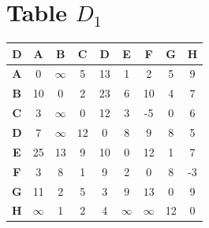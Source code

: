 \documentclass{article}
\begin{document}
\section{Table $D_{1}$}
\begin{center}
    \begin{tabular}{|c||c|c|c|c|c|c|c|c|}
        \hline
        \textbf{D} & \textbf{A} & \textbf{B} & \textbf{C} & \textbf{D} & \textbf{E} & \textbf{F} & \textbf{G} & \textbf{H} \\
        \hline
        \hline
        \textbf{A}& 0 & $\infty$ & 5 & 13 & 1 & 2 & 5 & 9 \\
        \hline
        \textbf{B}& 10 & 0 & 2 & \cellcolor[HTML]{D74894}$23$ & 6 & 10 & 4 & 7 \\
        \hline
        \textbf{C}& 3 & $\infty$ & 0 & 12 & 3 & -5 & 0 & 6 \\
        \hline
        \textbf{D}& 7 & $\infty$ & \cellcolor[HTML]{D74894}$12$ & 0 & 8 & \cellcolor[HTML]{D74894}$9$ & 8 & 5 \\
        \hline
        \textbf{E}& 25 & 13 & 9 & 10 & 0 & 12 & 1 & 7 \\
        \hline
        \textbf{F}& 3 & 8 & 1 & 9 & 2 & 0 & \cellcolor[HTML]{D74894}$8$ & -3 \\
        \hline
        \textbf{G}& 11 & 2 & 5 & 3 & 9 & \cellcolor[HTML]{D74894}$13$ & 0 & 9 \\
        \hline
        \textbf{H}& $\infty$ & 1 & 2 & 4 & $\infty$ & $\infty$ & 12 & 0 \\
        \hline
    \end{tabular}
\end{center}
\end{document}
